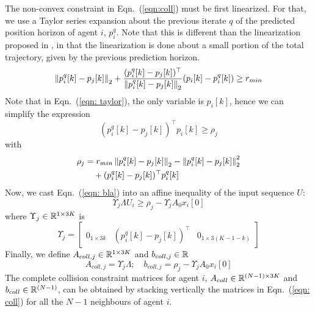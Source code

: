 The non-convex constraint in Eqn.~(\ref{eqn:coll}) must be first linearized. For that, we use a Taylor series expansion about the previous iterate $q$ of the predicted position horizon of agent $i$, $p_i^q$. Note that this is different than the linearization proposed in \cite{chen2015decoupled}, in that the linearization is done about a small portion of the total trajectory, given by the previous prediction horizon.
\begin{equation}
\label{eqn: taylor}
\left\Vert p^q_i[k] - p_j[k]\right\Vert_2 + \frac{(p_i^q[k]-p_j[k])^\top}{\left\Vert p^q_i[k] - p_j[k]\right\Vert_2}(p_i[k]-p_i^q[k]) \geq r_{min}
\end{equation}
Note that in Eqn.~(\ref{eqn: taylor}), the only variable is $p_i[k]$, hence we can simplify the expression
\begin{equation}
\label{eqn: bla}
(p_i^q[k]-p_j[k])^\top p_i[k] \geq \rho_j
\end{equation}
with
\begin{equation}
\begin{aligned}
\rho_j &= r_{min}\left\Vert p^q_i[k] - p_j[k]\right\Vert_2 - \left\Vert p^q_i[k] - p_j[k]\right\Vert_2^2 \\
& \hspace{1em}+ (p_i^q[k]-p_j[k])^\top p^q_i[k]
\end{aligned}
\end{equation}
Now, we cast Eqn.~(\ref{eqn: bla}) into an affine inequality of the input sequence $U$:
\begin{equation}
\Upsilon_j \Lambda U_i \geq \rho_j - \Upsilon_j A_0 x_i[0]
\end{equation}
where $\Upsilon_j \in {\mathbb R}^{1 \times 3K}$ is
\begin{equation}
\Upsilon_j = \begin{bmatrix}
0_{1\times 3k} & (p_i^q[k]-p_j[k])^\top & 0_{1 \times 3(K-1-k)}
\end{bmatrix}
\end{equation}
Finally, we define $A_{coll,j} \in {\mathbb R}^{1 \times 3K}$ and $b_{coll,j} \in {\mathbb R}$
\begin{equation}
\label{eqn: coll}
A_{coll,j} = \Upsilon_j \Lambda ; \quad b_{coll,j} = \rho_j - \Upsilon_j A_0 x_i[0]
\end{equation}
The complete collision constraint matrices for agent $i$, $A_{coll} \in {\mathbb R}^{(N-1) \times 3K}$ and $b_{coll} \in {\mathbb R}^{(N-1)}$, can be obtained by stacking vertically the matrices in Eqn.~(\ref{eqn: coll}) for all the $N-1$ neighbours of agent $i$.

